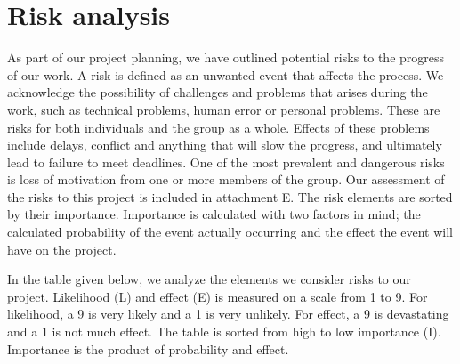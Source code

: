 \section{Risk analysis}
As part of our project planning, we have outlined potential risks to the progress of our work. A risk is defined as an unwanted event that affects the process. We acknowledge the possibility of challenges and problems that arises during the work, such as technical problems, human error or personal problems. These are risks for both individuals and the group as a whole. Effects of these problems include delays, conflict and anything that will slow the progress, and ultimately lead to failure to  meet deadlines. One of the most prevalent and dangerous risks is loss of motivation from one or more members of the group. Our assessment of the risks to this project is included in attachment E. The risk elements are sorted by their importance. Importance is calculated with two factors in mind; the calculated probability of the event actually occurring and the effect the event will have on the project. 

In the table given below, we analyze the elements we consider risks to our project. Likelihood (L) and effect (E) is measured on a scale from 1 to 9. For likelihood, a 9 is very likely and a 1 is very unlikely. For effect, a 9 is devastating and a 1 is not much effect. The table is sorted from high to low importance (I). Importance is the product of probability and effect. 


